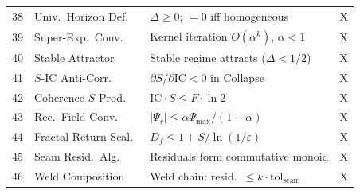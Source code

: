 \documentclass[
  aps,
  prd,
  preprint,
  superscriptaddress,
  nofootinbib,
  floatfix,
  longbibliography
]{revtex4-2}
\newcommand{\eps}{\varepsilon}
\newcommand{\tolseam}{\mathrm{tol}_{\mathrm{seam}}}
\newcommand{\IC}{\mathrm{IC}}
\newcommand{\Fid}{F}
\newcommand{\Ent}{S}
\newcommand{\Psifield}{\Psi}
\newcommand{\Psirec}{\Psi_{r}}
\newcommand{\hetgap}{\Delta}
\begin{document}
{\begin{longtable}{@{}cllc@{}}
38 & Univ.\ Horizon Def.\ & $\hetgap \geq 0$; $= 0$ iff homogeneous           & X \\
39 & Super-Exp.\ Conv.\  & Kernel iteration $O(\alpha^k)$, $\alpha < 1$        & X \\
40 & Stable Attractor    & Stable regime attracts ($\hetgap < 1/2$)             & X \\
41 & $\Ent$-$\IC$ Anti-Corr.\ & $\partial\Ent/\partial\IC < 0$ in Collapse    & X \\
42 & Coherence-$\Ent$ Prod.\ & $\IC\cdot\Ent \leq \Fid\cdot\ln 2$            & X \\
43 & Rec.\ Field Conv.\  & $|\Psirec| \leq \alpha\Psifield_{\max}/(1{-}\alpha)$ & X \\
44 & Fractal Return Scal.\ & $D_f \leq 1 + \Ent/\ln(1/\eps)$                  & X \\
45 & Seam Resid.\ Alg.\ & Residuals form commutative monoid                    & X \\
46 & Weld Composition    & Weld chain: resid.\ $\leq k\cdot\tolseam$           & X \\
\end{longtable}
}
\end{document}
